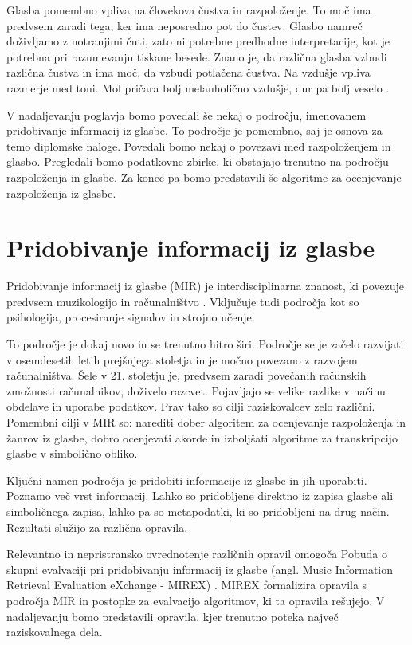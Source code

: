 \documentclass[a4paper, 12pt]{book}
\begin{document}
{Glasba pomembno vpliva na človekova čustva in razpoloženje. To moč ima predvsem zaradi tega, ker ima neposredno pot do čustev. Glasbo namreč do\-živ\-lja\-mo z notranjimi čuti, zato ni potrebne predhodne interpretacije, kot je potrebna pri razumevanju tiskane besede.  Znano je, da različna glasba vzbudi različna čustva in ima moč, da vzbudi potlačena čustva. Na vzdušje vpliva razmerje med toni. Mol pričara bolj melanholično vzdušje, dur pa bolj veselo \cite{lenko2009pomen}.

V nadaljevanju poglavja bomo povedali še nekaj o področju, imenovanem pridobivanje informacij iz glasbe. To področje je pomembno, saj je osnova za temo diplomske naloge. Povedali bomo nekaj o povezavi med razpoloženjem in glasbo. Pregledali bomo podatkovne zbirke, ki obstajajo trenutno na področju razpoloženja in glasbe. Za konec pa bomo predstavili še algoritme za ocenjevanje razpoloženja iz glasbe. 

\section{Pridobivanje informacij iz glasbe}

Pridobivanje informacij iz glasbe (MIR) je interdisciplinarna znanost, ki povezuje predvsem muzikologijo in računalništvo \cite{pesek2012prepoznavanje}. Vključuje tudi področja kot so psihologija, procesiranje signalov in strojno učenje.

To področje je dokaj novo in se trenutno hitro širi. Področje se je začelo razvijati v osemdesetih letih prejšnjega stoletja in je močno povezano z razvojem računalništva. Šele v 21. stoletju je, predvsem zaradi povečanih računskih zmožnosti računalnikov, doživelo razcvet. Pojavljajo se velike razlike v načinu obdelave in uporabe podatkov. Prav tako so cilji raziskovalcev zelo različni. Pomembni cilji v MIR so: narediti dober algoritem za ocenjevanje razpoloženja in žanrov iz glasbe, dobro ocenjevati akorde in izboljšati algoritme za transkripcijo glasbe v simbolično obliko. 

Ključni namen področja je pridobiti informacije iz glasbe in jih uporabiti. Poznamo več vrst informacij. Lahko so pridobljene direktno iz zapisa glasbe ali simboličnega zapisa, lahko pa so metapodatki, ki so pridobljeni na drug način. Rezultati služijo za različna opravila.

Relevantno in nepristransko ovrednotenje različnih opravil omogoča Pobuda o skupni evalvaciji pri pridobivanju informacij iz glasbe (angl. Music Information Retrieval Evaluation eXchange - MIREX) \cite{Downie2008, Downie2010}. MIREX formalizira opravila s področja MIR in postopke za evalvacijo algoritmov, ki ta opravila rešujejo. V nadaljevanju bomo predstavili opravila, kjer trenutno poteka največ raziskovalnega dela.

}
\end{document}
